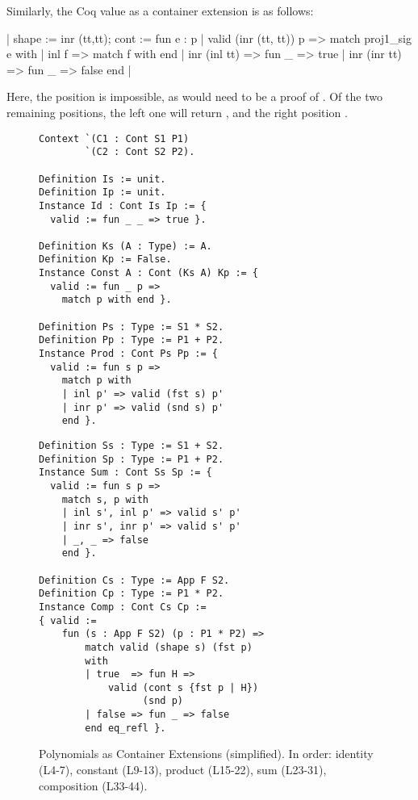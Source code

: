 \documentclass[ a4paper, UKenglish, cleveref, autoref, thm-restate]{lipics-v2021}
\begin{document}
Similarly, the Coq value  as a container
extension is as follows:
\begin{coqcode}
  {| shape := inr (tt,tt);
     cont := fun e : {p | valid (inr (tt, tt)) p} =>
        match proj1_sig e with
        | inl f => match f with end
        | inr (inl tt) => fun _ => true
        | inr (inr tt) => fun _ => false
        end
  |}
\end{coqcode}
Here, the position  is impossible, as
 would need to be a proof of .
Of the two remaining positions, the left one will return
, and the right position .
\begin{figure}
\begin{minipage}{.52\textwidth}
  \begin{verbatim}
Context `(C1 : Cont S1 P1)
        `(C2 : Cont S2 P2).

Definition Is := unit.
Definition Ip := unit.
Instance Id : Cont Is Ip := {
  valid := fun _ _ => true }.

Definition Ks (A : Type) := A.
Definition Kp := False.
Instance Const A : Cont (Ks A) Kp := {
  valid := fun _ p =>
    match p with end }.

Definition Ps : Type := S1 * S2.
Definition Pp : Type := P1 + P2.
Instance Prod : Cont Ps Pp := {
  valid := fun s p =>
    match p with
    | inl p' => valid (fst s) p'
    | inr p' => valid (snd s) p'
    end }.
\end{verbatim}
\end{minipage}
\begin{minipage}{.47\textwidth}
  \begin{verbatim}
Definition Ss : Type := S1 + S2.
Definition Sp : Type := P1 + P2.
Instance Sum : Cont Ss Sp := {
  valid := fun s p =>
    match s, p with
    | inl s', inl p' => valid s' p'
    | inr s', inr p' => valid s' p'
    | _, _ => false
    end }.

Definition Cs : Type := App F S2.
Definition Cp : Type := P1 * P2.
Instance Comp : Cont Cs Cp :=
{ valid :=
    fun (s : App F S2) (p : P1 * P2) =>
        match valid (shape s) (fst p)
        with
        | true  => fun H =>
            valid (cont s {fst p | H})
                  (snd p)
        | false => fun _ => false
        end eq_refl }.
  \end{verbatim}
\end{minipage}
  \caption{Polynomials as Container Extensions (simplified). In order: identity
  (L4-7), constant (L9-13), product (L15-22), sum (L23-31), composition
  (L33-44).}
  \label{fig:poly}
\end{figure}
\end{document}
